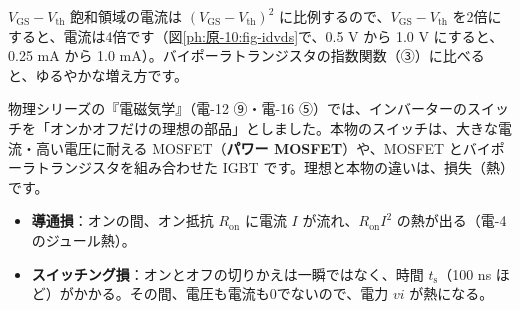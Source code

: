 \begin{phflow}
\end{phflow}

\begin{phbaisuru}{$V_{\mathrm{GS}}-V_{\mathrm{th}}$}
飽和領域の電流は $(V_{\mathrm{GS}}-V_{\mathrm{th}})^2$ に比例するので、$V_{\mathrm{GS}}-V_{\mathrm{th}}$ を2倍にすると、電流は4倍です（図\ref{ph:原-10:fig-idvds}で、0.5 V から 1.0 V にすると、0.25 mA から 1.0 mA）。バイポーラトランジスタの指数関数（③）に比べると、ゆるやかな増え方です。
\end{phbaisuru}

\begin{phmodel}
\end{phmodel}

\label{ph:原-10:sec11}
物理シリーズの『電磁気学』（電-12 ⑨・電-16 ⑤）では、インバーターのスイッチを「オンかオフだけの理想の部品」としました。本物のスイッチは、大きな電流・高い電圧に耐える MOSFET（\textbf{パワー MOSFET}）や、MOSFET とバイポーラトランジスタを組み合わせた IGBT です。理想と本物の違いは、損失（熱）です。

\begin{itemize}[label={\color{bkTheme}●}, leftmargin=1.6\zw, itemsep=1pt, topsep=2pt]
\item \textbf{導通損}：オンの間、オン抵抗 $R_{\mathrm{on}}$ に電流 $I$ が流れ、$R_{\mathrm{on}}I^2$ の熱が出る（電-4 のジュール熱）。
\item \textbf{スイッチング損}：オンとオフの切りかえは一瞬ではなく、時間 $t_{\mathrm s}$（100 ns ほど）がかかる。その間、電圧も電流も0でないので、電力 $vi$ が熱になる。
\end{itemize}

